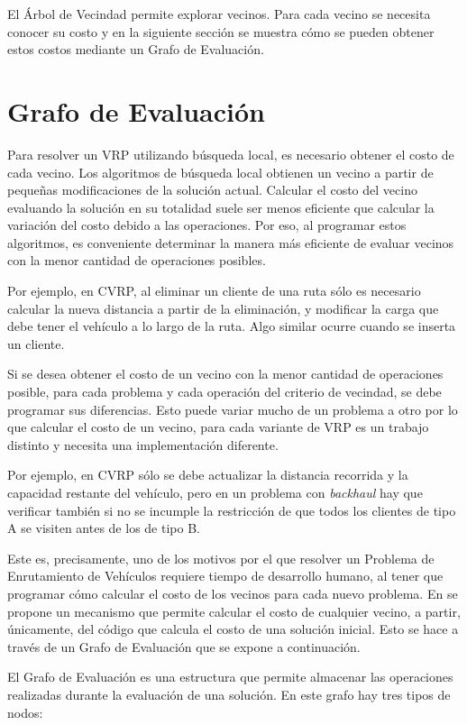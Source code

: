 El Árbol de Vecindad permite explorar vecinos. Para cada vecino se necesita conocer su costo y en la siguiente sección se muestra cómo se pueden obtener estos costos mediante un Grafo de Evaluación.

\section{Grafo de Evaluación}\label{1-JJ}
Para resolver un VRP utilizando búsqueda local, es necesario obtener el costo de cada vecino. Los algoritmos de búsqueda local obtienen un vecino a partir de pequeñas modificaciones de la solución actual. Calcular el costo del vecino evaluando la solución en su totalidad suele ser menos eficiente que calcular la variación del costo debido a las operaciones. Por eso, al programar estos algoritmos, es conveniente determinar la manera más eficiente de evaluar vecinos con la menor cantidad de operaciones posibles. 

Por ejemplo, en CVRP, al eliminar un cliente de una ruta sólo es necesario calcular la nueva distancia a partir de la eliminación, y modificar la carga que debe tener el vehículo a lo largo de la ruta. Algo similar ocurre cuando se inserta un cliente.

Si se desea obtener el costo de un vecino con la menor cantidad de operaciones posible, para cada problema y cada operación del criterio de vecindad, se debe programar sus diferencias. Esto puede variar mucho de un problema a otro por lo que calcular el costo de un vecino, para cada variante de VRP es un trabajo distinto y necesita una implementación diferente.

Por ejemplo, en CVRP sólo se debe actualizar la distancia recorrida y la capacidad restante del vehículo, pero en un problema con \textit{backhaul} hay que verificar también si no se incumple la restricción de que todos los clientes de tipo A se visiten antes de los de tipo B.  

Este es, precisamente, uno de los motivos por el que resolver un Problema de Enrutamiento de Vehículos requiere tiempo de desarrollo humano, al tener que programar cómo calcular el costo de los vecinos para cada nuevo problema. En \cite{JJ} se propone un mecanismo que permite calcular el costo de cualquier vecino, a partir, únicamente, del código que calcula el costo de una solución inicial. Esto se hace a través de un Grafo de Evaluación que se expone a continuación.

El Grafo de Evaluación es una estructura que permite almacenar las operaciones realizadas durante la evaluación de una solución. En este grafo hay tres tipos de nodos:


